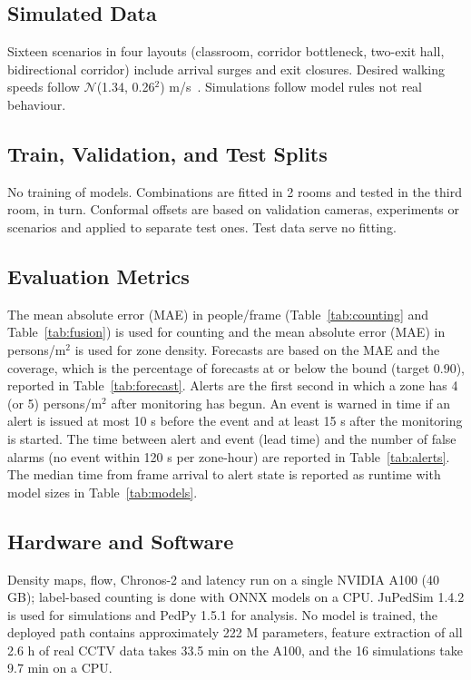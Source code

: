 \documentclass[conference]{IEEEtran}
\newcommand{\pmsq}{persons/m$^2$}
\begin{document}
\subsection{Simulated Data}
Sixteen scenarios in four layouts (classroom, corridor bottleneck, two-exit hall, bidirectional corridor) include arrival surges and exit closures. Desired walking speeds follow $\mathcal{N}$(1.34, 0.26$^{2}$) m/s~\cite{weidmann1993}. Simulations follow model rules not real behaviour.

\subsection{Train, Validation, and Test Splits}
No training of models. Combinations are fitted in 2 rooms and tested in the third room, in turn. Conformal offsets are based on validation cameras, experiments or scenarios and applied to separate test ones. Test data serve no fitting.

\subsection{Evaluation Metrics}
The mean absolute error (MAE) in people/frame (Table~\ref{tab:counting} and Table~\ref{tab:fusion}) is used for counting and the mean absolute error (MAE) in \pmsq{} is used for zone density. Forecasts are based on the MAE and the coverage, which is the percentage of forecasts at or below the bound (target 0.90), reported in Table~\ref{tab:forecast}. Alerts are the first second in which a zone has 4 (or 5) \pmsq{} after monitoring has begun. An event is warned in time if an alert is issued at most 10 s before the event and at least 15 s after the monitoring is started. The time between alert and event (lead time) and the number of false alarms (no event within 120 s per zone-hour) are reported in Table~\ref{tab:alerts}. The median time from frame arrival to alert state is reported as runtime with model sizes in Table~\ref{tab:models}.

\subsection{Hardware and Software}
Density maps, flow, Chronos-2 and latency run on a single NVIDIA A100 (40 GB); label-based counting is done with ONNX models on a CPU. JuPedSim 1.4.2 is used for simulations and PedPy 1.5.1 for analysis. No model is trained, the deployed path contains approximately 222 M parameters, feature extraction of all 2.6 h of real CCTV data takes 33.5 min on the A100, and the 16 simulations take 9.7 min on a CPU.
\end{document}
